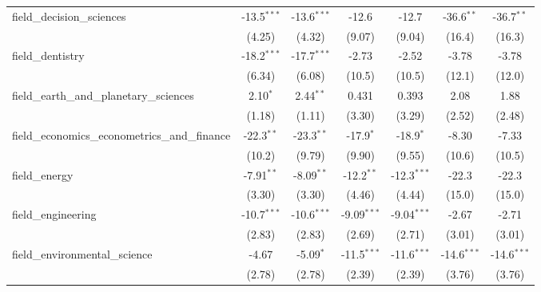 \begin{tabular}{lcccccc}
   field\_decision\_sciences                                   & -13.5$^{***}$ & -13.6$^{***}$ & -12.6         & -12.7         & -36.6$^{**}$  & -36.7$^{**}$\\   
                                                               & (4.25)        & (4.32)        & (9.07)        & (9.04)        & (16.4)        & (16.3)\\   
   field\_dentistry                                            & -18.2$^{***}$ & -17.7$^{***}$ & -2.73         & -2.52         & -3.78         & -3.78\\   
                                                               & (6.34)        & (6.08)        & (10.5)        & (10.5)        & (12.1)        & (12.0)\\   
   field\_earth\_and\_planetary\_sciences                      & 2.10$^{*}$    & 2.44$^{**}$   & 0.431         & 0.393         & 2.08          & 1.88\\   
                                                               & (1.18)        & (1.11)        & (3.30)        & (3.29)        & (2.52)        & (2.48)\\   
   field\_economics\_econometrics\_and\_finance                & -22.3$^{**}$  & -23.3$^{**}$  & -17.9$^{*}$   & -18.9$^{*}$   & -8.30         & -7.33\\   
                                                               & (10.2)        & (9.79)        & (9.90)        & (9.55)        & (10.6)        & (10.5)\\   
   field\_energy                                               & -7.91$^{**}$  & -8.09$^{**}$  & -12.2$^{**}$  & -12.3$^{***}$ & -22.3         & -22.3\\   
                                                               & (3.30)        & (3.30)        & (4.46)        & (4.44)        & (15.0)        & (15.0)\\   
   field\_engineering                                          & -10.7$^{***}$ & -10.6$^{***}$ & -9.09$^{***}$ & -9.04$^{***}$ & -2.67         & -2.71\\   
                                                               & (2.83)        & (2.83)        & (2.69)        & (2.71)        & (3.01)        & (3.01)\\   
   field\_environmental\_science                               & -4.67         & -5.09$^{*}$   & -11.5$^{***}$ & -11.6$^{***}$ & -14.6$^{***}$ & -14.6$^{***}$\\   
                                                               & (2.78)        & (2.78)        & (2.39)        & (2.39)        & (3.76)        & (3.76)\\   

\end{tabular}
